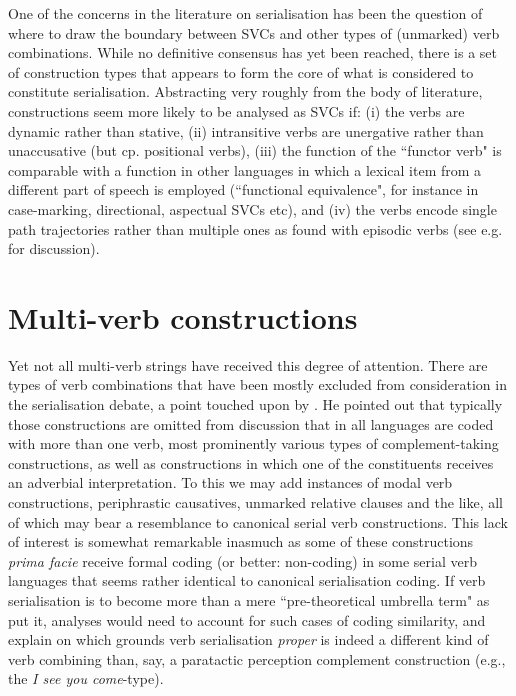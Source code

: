 \largerpage
One of the concerns in the literature on serialisation has been the question of where to draw the boundary between SVCs and other types of (unmarked) verb combinations. While no definitive consensus has yet been reached, there is a set of construction types that appears to form the core of what is considered to constitute serialisation. Abstracting very roughly from the body of literature, constructions seem more likely to be analysed as SVCs if: (i) the verbs are dynamic rather than stative, (ii) intransitive verbs are unergative rather than unaccusative (but cp. positional verbs), (iii) the function of the ``functor verb" is comparable with a function in other languages in which a lexical item from a different part of speech is employed (``functional equivalence", for instance in case-marking, directional, aspectual SVCs etc), and (iv) the verbs encode single path trajectories rather than multiple ones as found with episodic verbs (see e.g. \citealt{pawley2011event} for discussion). 

\section{Multi-verb constructions}

Yet not all multi-verb strings have received this degree of attention. There are types of verb combinations that have been mostly excluded from consideration in the serialisation debate, a point touched upon by \citet{givon1991serial}. He pointed out that typically those constructions are omitted from discussion that in all languages are coded with more than one verb, most prominently various types of complement-taking constructions, as well as constructions in which one of the constituents receives an adverbial interpretation. To this we may add instances of modal verb constructions, periphrastic causatives, unmarked relative clauses and the like, all of which may bear a resemblance to canonical serial verb constructions. This lack of interest is somewhat remarkable inasmuch as some of these constructions \emph{prima facie} receive formal coding (or better: non-coding) in some serial verb languages that seems rather identical to canonical serialisation coding. If verb serialisation is to become more than a mere ``pre-theoretical umbrella term" as \citet{zwicky1990we} put it, analyses would need to account for such cases of coding similarity, and explain on which grounds verb serialisation \textit{proper} is indeed a different kind of verb combining than, say, a paratactic perception complement construction (e.g., the \textit{I see you come}-type). 

